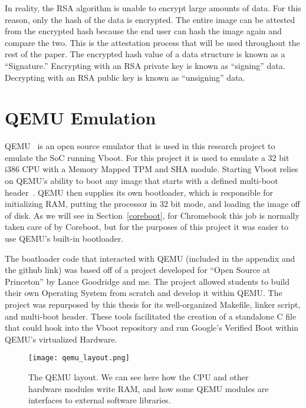 In reality, the RSA algorithm is unable to encrypt large amounts of data.
For this reason, only the hash of the data is encrypted. 
The entire image can be attested from the encrypted hash because the end user
can hash the image again and compare the two.
This is the attestation process that will be used throughout the rest of the
paper.
The encrypted hash value of a data structure is known as a ``Signature.'' 
Encrypting with an RSA private key is known as ``signing'' data.
Decrypting with an RSA public key is known as ``unsigning'' data.

\section{QEMU Emulation}\label{qemu_em}


QEMU~\cite{qemu-site} is an open source emulator that is used in this research project to
emulate the SoC running Vboot.
For this project it is used to emulate a 32 bit i386 CPU with a Memory Mapped TPM and SHA module.
Starting Vboot relies on QEMU's ability to boot any image that starts with a defined multi-boot header~\cite{multiboot}.
QEMU then supplies its own bootloader, which is responsible for initializing RAM, putting the processor in 32 bit mode, and loading the image off of disk.
As we will see in Section~\ref{coreboot}, for Chromebook this job is normally taken care of by Coreboot, but for the purposes of this project it was easier to use QEMU's built-in bootloader.

The boatloader code that interacted with QEMU (included in the appendix and the
github link) was based off of a project developed for ``Open Source at
Princeton'' by Lance Goodridge and me.
The project allowed students to build their own Operating System from scratch and develop it within QEMU\@.
The project was repurposed by this thesis for its well-organized Makefile, linker script, and multi-boot header.
These tools facilitated the creation of a standalone C file that could hook into the Vboot repository and run Google's Verified Boot within QEMU's virtualized Hardware.

\begin{figure}
  \centering
  \texttt{[image: qemu\_layout.png]}
  \caption[QEMU Software Library Layout]{The QEMU layout. We can see here how the CPU and other hardware modules write RAM, and how some QEMU modules are interfaces to external software libraries.}
  \label{fig:qemu_layout}
\end{figure}

